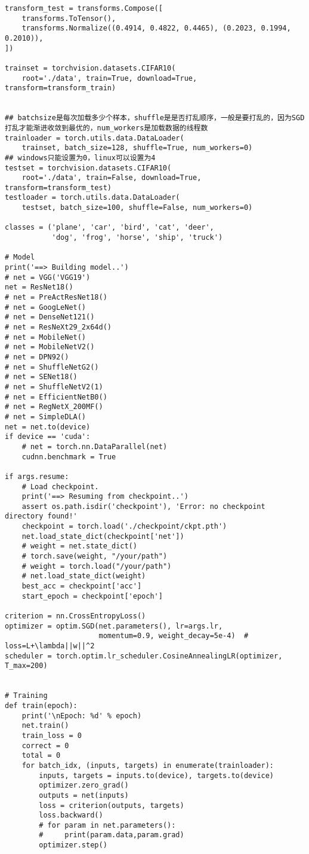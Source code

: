 \documentclass{article}
\begin{document}
\begin{lstlisting}
transform_test = transforms.Compose([
    transforms.ToTensor(),
    transforms.Normalize((0.4914, 0.4822, 0.4465), (0.2023, 0.1994, 0.2010)),
])

trainset = torchvision.datasets.CIFAR10(
    root='./data', train=True, download=True, transform=transform_train)


## batchsize是每次加载多少个样本，shuffle是是否打乱顺序，一般是要打乱的，因为SGD打乱才能渐进收敛到最优的，num_workers是加载数据的线程数
trainloader = torch.utils.data.DataLoader(
    trainset, batch_size=128, shuffle=True, num_workers=0)
## windows只能设置为0，linux可以设置为4
testset = torchvision.datasets.CIFAR10(
    root='./data', train=False, download=True, transform=transform_test)
testloader = torch.utils.data.DataLoader(
    testset, batch_size=100, shuffle=False, num_workers=0)

classes = ('plane', 'car', 'bird', 'cat', 'deer',
           'dog', 'frog', 'horse', 'ship', 'truck')

# Model
print('==> Building model..')
# net = VGG('VGG19')
net = ResNet18()
# net = PreActResNet18()
# net = GoogLeNet()
# net = DenseNet121()
# net = ResNeXt29_2x64d()
# net = MobileNet()
# net = MobileNetV2()
# net = DPN92()
# net = ShuffleNetG2()
# net = SENet18()
# net = ShuffleNetV2(1)
# net = EfficientNetB0()
# net = RegNetX_200MF()
# net = SimpleDLA()
net = net.to(device)
if device == 'cuda':
    # net = torch.nn.DataParallel(net)
    cudnn.benchmark = True

if args.resume:
    # Load checkpoint.
    print('==> Resuming from checkpoint..')
    assert os.path.isdir('checkpoint'), 'Error: no checkpoint directory found!'
    checkpoint = torch.load('./checkpoint/ckpt.pth')
    net.load_state_dict(checkpoint['net'])
    # weight = net.state_dict()
    # torch.save(weight, "/your/path")
    # weight = torch.load("/your/path")
    # net.load_state_dict(weight)
    best_acc = checkpoint['acc']
    start_epoch = checkpoint['epoch']

criterion = nn.CrossEntropyLoss()
optimizer = optim.SGD(net.parameters(), lr=args.lr,
                      momentum=0.9, weight_decay=5e-4)  # loss=L+\lambda||w||^2
scheduler = torch.optim.lr_scheduler.CosineAnnealingLR(optimizer, T_max=200)


# Training
def train(epoch):
    print('\nEpoch: %d' % epoch)
    net.train()
    train_loss = 0
    correct = 0
    total = 0
    for batch_idx, (inputs, targets) in enumerate(trainloader):
        inputs, targets = inputs.to(device), targets.to(device)
        optimizer.zero_grad()
        outputs = net(inputs)
        loss = criterion(outputs, targets)
        loss.backward()
        # for param in net.parameters():
        #     print(param.data,param.grad)
        optimizer.step()


\end{lstlisting}
\end{document}
